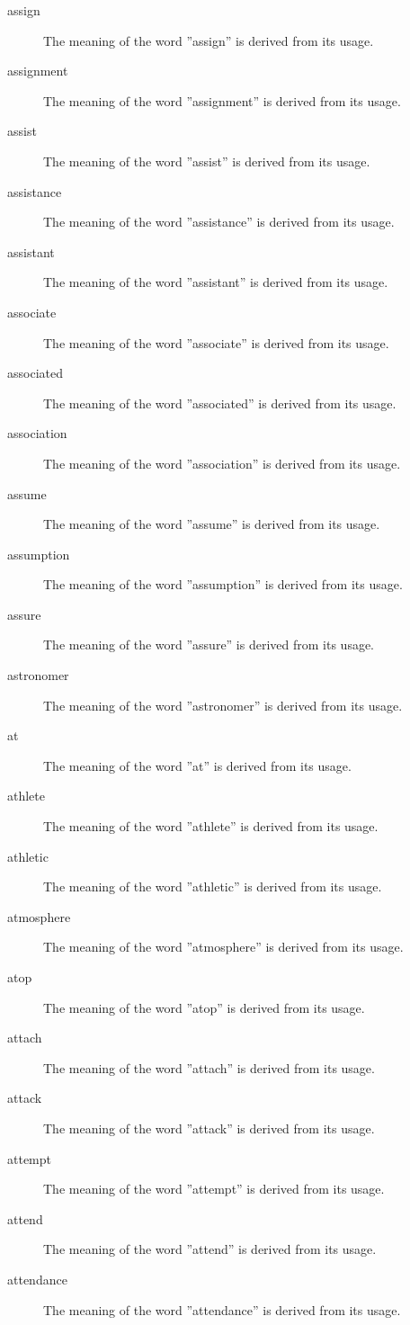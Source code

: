 \documentclass[12pt, letterpaper]{memoir}
\begin{document}
\begin{description}
\item[assign] The meaning of the word ''assign'' is derived from its usage.
\item[assignment] The meaning of the word ''assignment'' is derived from its usage.
\item[assist] The meaning of the word ''assist'' is derived from its usage.
\item[assistance] The meaning of the word ''assistance'' is derived from its usage.
\item[assistant] The meaning of the word ''assistant'' is derived from its usage.
\item[associate] The meaning of the word ''associate'' is derived from its usage.
\item[associated] The meaning of the word ''associated'' is derived from its usage.
\item[association] The meaning of the word ''association'' is derived from its usage.
\item[assume] The meaning of the word ''assume'' is derived from its usage.
\item[assumption] The meaning of the word ''assumption'' is derived from its usage.
\item[assure] The meaning of the word ''assure'' is derived from its usage.
\item[astronomer] The meaning of the word ''astronomer'' is derived from its usage.
\item[at] The meaning of the word ''at'' is derived from its usage.
\item[athlete] The meaning of the word ''athlete'' is derived from its usage.
\item[athletic] The meaning of the word ''athletic'' is derived from its usage.
\item[atmosphere] The meaning of the word ''atmosphere'' is derived from its usage.
\item[atop] The meaning of the word ''atop'' is derived from its usage.
\item[attach] The meaning of the word ''attach'' is derived from its usage.
\item[attack] The meaning of the word ''attack'' is derived from its usage.
\item[attempt] The meaning of the word ''attempt'' is derived from its usage.
\item[attend] The meaning of the word ''attend'' is derived from its usage.
\item[attendance] The meaning of the word ''attendance'' is derived from its usage.

\end{description}
\end{document}
